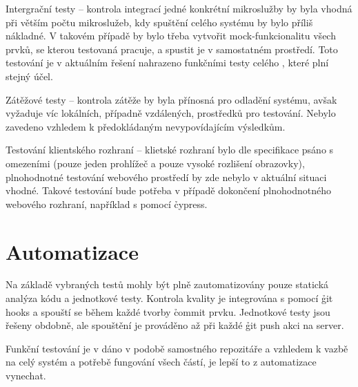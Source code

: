 \begin{dl}
   \item[Intergrační testy \g{MS}] – kontrola integrací jedné konkrétní mikroslužby by byla vhodná při větším počtu mikroslužeb, kdy spuštění celého systému by bylo příliš nákladné.
   V takovém případě by bylo třeba vytvořit mock-funkcionalitu všech prvků, se kterou testovaná  pracuje, a spustit je v samostatném prostředí.
   Toto testování je v aktuálním řešení nahrazeno funkčními testy celého , které plní stejný účel.
   \item[Zátěžové testy] – kontrola zátěže by byla přínosná pro odladění systému, avšak vyžaduje víc lokálních, případně vzdálených, prostředků pro testování.
   Nebylo zavedeno vzhledem k předokládaným nevypovídajícím výsledkům.
   \item[Testování klientského rozhraní] – klietské rozhraní bylo dle specifikace psáno s omezeními (pouze jeden prohlížeč a pouze vysoké rozlišení obrazovky), plnohodnotné testování webového prostředí by zde nebylo v aktuální situaci vhodné.
   Takové testování bude potřeba v případě dokončení plnohodnotného webového rozhraní, například s pomocí \h{cypress}.
\end{dl}



\section{Automatizace}\label{sec:automatization}

Na základě vybraných testů mohly být plně zautomatizovány pouze statická analýza kódu a jednotkové testy.
Kontrola kvality je integrována s pomocí \h{git hooks} a spouští se během každé tvorby \h{commit} prvku.
Jednotkové testy jsou řešeny obdobně, ale spouštění je prováděno až při každé \h{git push} akci na server.

Funkční testování je v dáno v podobě samostného repozitáře a vzhledem k vazbě na celý systém a potřebě fungování všech částí, je lepší to z automatizace vynechat.

